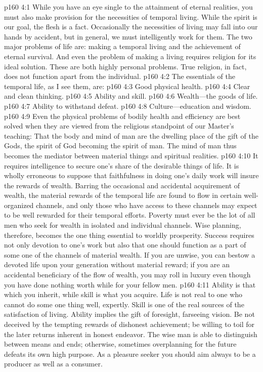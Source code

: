 \vs p160 4:1 While you have an eye single to the attainment of eternal realities, you must also make provision for the necessities of temporal living. While the spirit is our goal, the flesh is a fact. Occasionally the necessities of living may fall into our hands by accident, but in general, we must intelligently work for them. The two major problems of life are: making a temporal living and the achievement of eternal survival. And even the problem of making a living requires religion for its ideal solution. These are both highly personal problems. True religion, in fact, does not function apart from the individual.
\pc \vs p160 4:2 The essentials of the temporal life, as I see them, are:
\pc \vs p160 4:3 \bibnobreakspace Good physical health.
\vs p160 4:4 \bibnobreakspace Clear and clean thinking.
\vs p160 4:5 \bibnobreakspace Ability and skill.
\vs p160 4:6 \bibnobreakspace Wealth---the goods of life.
\vs p160 4:7 \bibnobreakspace Ability to withstand defeat.
\vs p160 4:8 \bibnobreakspace Culture---education and wisdom.
\pc \vs p160 4:9 Even the physical problems of bodily health and efficiency are best solved when they are viewed from the religious standpoint of our Master’s teaching: That the body and mind of man are the dwelling place of the gift of the Gods, the spirit of God becoming the spirit of man. The mind of man thus becomes the mediator between material things and spiritual realities.
\pc \vs p160 4:10 It requires intelligence to secure one’s share of the desirable things of life. It is wholly erroneous to suppose that faithfulness in doing one’s daily work will insure the rewards of wealth. Barring the occasional and accidental acquirement of wealth, the material rewards of the temporal life are found to flow in certain well\hyp{}organized channels, and only those who have access to these channels may expect to be well rewarded for their temporal efforts. Poverty must ever be the lot of all men who seek for wealth in isolated and individual channels. Wise planning, therefore, becomes the one thing essential to worldly prosperity. Success requires not only devotion to one’s work but also that one should function as a part of some one of the channels of material wealth. If you are unwise, you can bestow a devoted life upon your generation without material reward; if you are an accidental beneficiary of the flow of wealth, you may roll in luxury even though you have done nothing worth while for your fellow men.
\vs p160 4:11 Ability is that which you inherit, while skill is what you acquire. Life is not real to one who cannot do some one thing well, expertly. Skill is one of the real sources of the satisfaction of living. Ability implies the gift of foresight, farseeing vision. Be not deceived by the tempting rewards of dishonest achievement; be willing to toil for the later returns inherent in honest endeavor. The wise man is able to distinguish between means and ends; otherwise, sometimes overplanning for the future defeats its own high purpose. As a pleasure seeker you should aim always to be a producer as well as a consumer.
